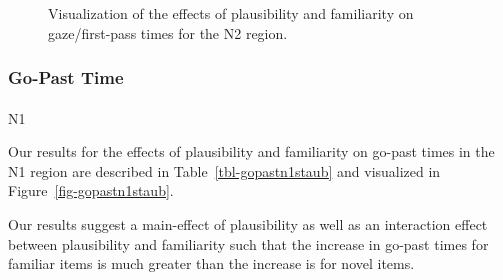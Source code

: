 \documentclass[
  12pt,
  letterpaper,
]{scrreprt}
\makeatletter
\let\oldparagraph\paragraph
\renewcommand{\paragraph}{
    \@ifstar
      \xxxParagraphStar
      \xxxParagraphNoStar
  }
\newcommand{\xxxParagraphStar}[1]{\oldparagraph*{#1}\mbox{}}
\newcommand{\xxxParagraphNoStar}[1]{\oldparagraph{#1}\mbox{}}
\makeatother
\begin{document}
\begin{figure}[htbp]

\caption{\label{fig-gazen2staub}Visualization of the effects of
plausibility and familiarity on gaze/first-pass times for the N2
region.}


\end{figure}%

\subsubsection{Go-Past Time}\label{go-past-time}

\paragraph{N1}\label{n1-2}

Our results for the effects of plausibility and familiarity on go-past
times in the N1 region are described in Table~\ref{tbl-gopastn1staub}
and visualized in Figure~\ref{fig-gopastn1staub}.

Our results suggest a main-effect of plausibility as well as an
interaction effect between plausibility and familiarity such that the
increase in go-past times for familiar items is much greater than the
increase is for novel items.
\end{document}
